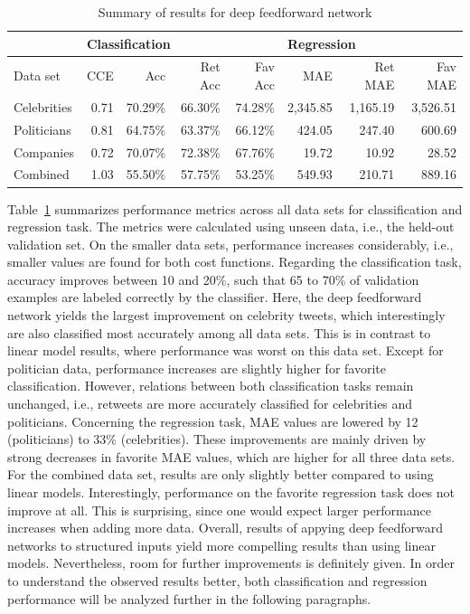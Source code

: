 \begin{table}
  \begin{tabular}{lrrrrrrr}
    \toprule
    & \multicolumn{4}{l}{Classification} & \multicolumn{3}{l}{Regression} \\
    \midrule
    Data set & CCE & Acc & Ret Acc & Fav Acc & MAE & Ret MAE & Fav MAE \\
    \midrule
    Celebrities & 0.71 & 70.29\% & 66.30\% & 74.28\% & 2,345.85 & 1,165.19 & 3,526.51 \\
    Politicians & 0.81 & 64.75\% & 63.37\% & 66.12\% & 424.05 & 247.40 & 600.69 \\
    Companies & 0.72 & 70.07\% & 72.38\% & 67.76\% & 19.72 & 10.92 & 28.52 \\
    Combined & 1.03 & 55.50\% & 57.75\% & 53.25\% & 549.93 & 210.71 & 889.16 \\
    \bottomrule
  \end{tabular}
  \caption{Summary of results for deep feedforward network}
  \label{tab:deep1_results}
\end{table}

Table~\ref{tab:deep1_results} summarizes performance metrics across all data
sets for classification and regression task.
The metrics were calculated using unseen data, i.e., the held-out validation
set.
On the smaller data sets, performance increases considerably, i.e.,
smaller values are found for both cost functions.
Regarding the classification task, accuracy improves between 10 and 20\%, such
that 65 to 70\% of validation examples are labeled correctly by the classifier.
Here, the deep feedforward network yields the largest improvement on celebrity
tweets, which interestingly are also classified most accurately among all data sets.
This is in contrast to linear model results, where performance was worst on this
data set.
Except for politician data, performance increases are slightly higher for favorite
classification.
However, relations between both classification tasks remain unchanged, i.e.,
retweets are more accurately classified for celebrities and politicians.
Concerning the regression task, MAE values are lowered by 12 (politicians) to
33\% (celebrities).
These improvements are mainly driven by strong decreases in favorite MAE values,
which are higher for all three data sets.
For the combined data set, results are only slightly better compared to using
linear models.
Interestingly, performance on the favorite regression task does not improve
at all.
This is surprising, since one would expect larger performance increases when
adding more data.
Overall, results of appying deep feedforward networks to structured inputs
yield more compelling results than using linear models.
Nevertheless, room for further improvements is definitely given.
In order to understand the observed results better, both classification and 
regression performance will be analyzed further in the following paragraphs.

